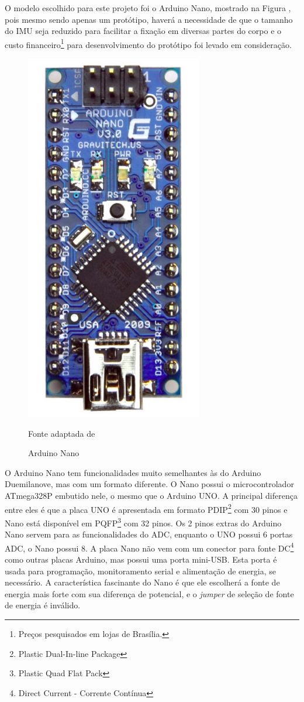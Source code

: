 O  modelo escolhido para este projeto foi o Arduino Nano, mostrado na Figura , pois mesmo sendo apenas um protótipo, haverá a necessidade de que o tamanho do IMU seja reduzido para facilitar a fixação em diversas partes do corpo e o custo financeiro\footnote{Preços pesquisados em lojas de Brasília.} para desenvolvimento do protótipo foi levado em consideração.

\begin{figure}[h]
	\centering
	\includegraphics[keepaspectratio=true,scale=0.7
	]{figuras/arduino_nano.png}
	\caption{ Arduino Nano }
	Fonte adaptada de \cite{john2018}
	\label{arduno}	
\end{figure}


O Arduino Nano tem funcionalidades muito semelhantes às do Arduino Duemilanove, mas com um formato diferente. O Nano possui o microcontrolador ATmega328P embutido nele, o mesmo que o Arduino UNO. A principal diferença entre eles é que a placa UNO é apresentada em formato PDIP\footnote{Plastic Dual-In-line Package} com 30 pinos e Nano está disponível em PQFP\footnote{Plastic Quad Flat Pack} com 32 pinos. Os 2 pinos extras do Arduino Nano servem para as funcionalidades do ADC, enquanto o UNO possui 6 portas ADC, o Nano possui 8. A placa Nano não vem com um conector para fonte DC\footnote{Direct Current - Corrente Contínua} como outras placas Arduino, mas possui uma porta mini-USB. Esta porta é usada para programação, monitoramento serial e alimentação de energia, se necessário. A característica fascinante do Nano é que ele escolherá a fonte de energia mais forte com sua diferença de potencial, e o \textit{jumper} de seleção de fonte de energia é inválido\cite{john2018}.  


